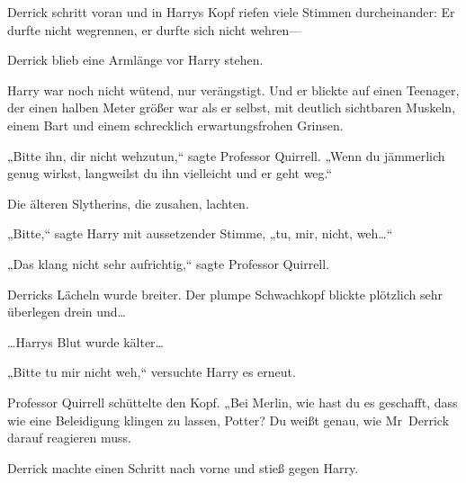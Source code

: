 Derrick schritt voran und in Harrys Kopf riefen viele Stimmen durcheinander: Er durfte nicht wegrennen, er durfte sich nicht wehren—

Derrick blieb eine Armlänge vor Harry stehen.

Harry war noch nicht wütend, nur verängstigt. Und er blickte auf einen Teenager, der einen halben Meter größer war als er selbst, mit deutlich sichtbaren Muskeln, einem Bart und einem schrecklich erwartungsfrohen Grinsen.

„Bitte ihn, dir nicht wehzutun,“ sagte Professor Quirrell. „Wenn du jämmerlich genug wirkst, langweilst du ihn vielleicht und er geht weg.“

Die älteren Slytherins, die zusahen, lachten.

„Bitte,“ sagte Harry mit aussetzender Stimme, „tu, mir, nicht, weh…“

„Das klang nicht sehr aufrichtig,“ sagte Professor Quirrell.

Derricks Lächeln wurde breiter. Der plumpe Schwachkopf blickte plötzlich sehr überlegen drein und…

…Harrys Blut wurde kälter…

„Bitte tu mir nicht weh,“ versuchte Harry es erneut.

Professor Quirrell schüttelte den Kopf. „Bei Merlin, wie hast du es geschafft, dass wie eine Beleidigung klingen zu lassen, Potter? Du weißt genau, wie Mr~Derrick darauf reagieren muss.

Derrick machte einen Schritt nach vorne und stieß gegen Harry.

